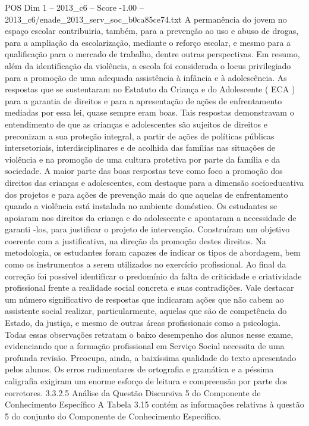 \begin{textsample}{POS Dim 1 – 2013\_c6 – Score -1.00 – 2013\_c6/enade\_2013\_serv\_soc\_b0ca85ce74.txt}
A permanência do jovem no espaço escolar contribuiria, também, para a prevenção ao uso e abuso de drogas, para a ampliação da escolarização, mediante o reforço escolar, e mesmo para a qualificação para o mercado de trabalho, dentre outras perspectivas.
Em resumo, além da identificação da violência, a escola foi considerada o locus privilegiado para a promoção de uma adequada assistência à infância e à adolescência.
As respostas que se sustentaram no Estatuto da Criança e do Adolescente ( ECA ) para a garantia de direitos e para a apresentação de ações de enfrentamento mediadas por essa lei, quase sempre eram boas.
Tais respostas demonstravam o entendimento de que as crianças e adolescentes são sujeitos de direitos e preconizam a sua proteção integral, a partir de ações de políticas públicas intersetoriais, interdisciplinares e de acolhida das famílias nas situações de violência e na promoção de uma cultura protetiva por parte da família e da sociedade.
A maior parte das boas respostas teve como foco a promoção dos direitos das crianças e adolescentes, com destaque para a dimensão socioeducativa dos projetos e para ações de prevenção mais do que aquelas de enfrentamento quando a violência está instalada no ambiente doméstico.
Os estudantes se apoiaram nos direitos da criança e do adolescente e apontaram a necessidade de garanti -los, para justificar o projeto de intervenção.
Construíram um objetivo coerente com a justificativa, na direção da promoção destes direitos.
Na metodologia, os estudantes foram capazes de indicar os tipos de abordagem, bem como os instrumentos a serem utilizados no exercício profissional.
Ao final da correção foi possível identificar o predomínio da falta de criticidade e criatividade profissional frente a realidade social concreta e suas contradições.
Vale destacar um número significativo de respostas que indicaram ações que não cabem ao assistente social realizar, particularmente, aquelas que são de competência do Estado, da justiça, e mesmo de outras áreas profissionais como a psicologia.
Todas essas observações retratam o baixo desempenho dos alunos nesse exame, evidenciando que a formação profissional em Serviço Social necessita de uma profunda revisão.
Preocupa, ainda, a baixíssima qualidade do texto apresentado pelos alunos.
Os erros rudimentares de ortografia e gramática e a péssima caligrafia exigiram um enorme esforço de leitura e compreensão por parte dos corretores. 3.3.2.5 Análise da Questão Discursiva 5 do Componente de Conhecimento Específico A Tabela 3.15 contém as informações relativas à questão 5 do conjunto do Componente de Conhecimento Específico.

\end{textsample}
